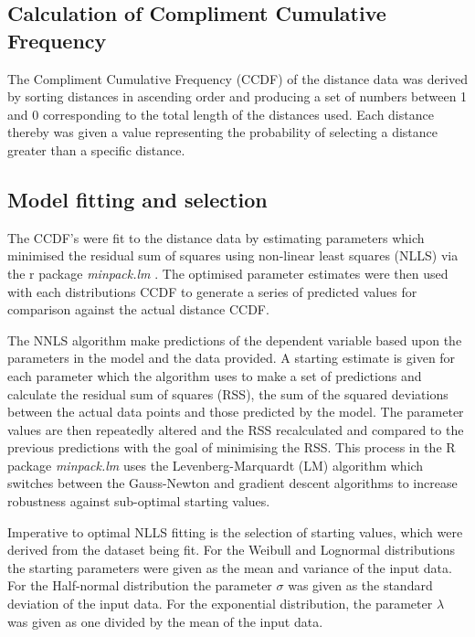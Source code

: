 \documentclass[11pt]{article}
\begin{document}
\begin{linenumbers}
\subsection{Calculation of Compliment Cumulative Frequency}
The Compliment Cumulative Frequency (CCDF) of the distance data was derived by sorting distances in ascending order and producing a set of numbers between 1 and 0 corresponding to the total length of the distances used. Each distance thereby was given a value representing the probability of selecting a distance greater than a specific distance.

\subsection{Model fitting and selection}
The CCDF's were fit to the distance data by estimating parameters which minimised the residual sum of squares using non-linear least squares (NLLS) via the r package \textit{minpack.lm} \citep{Timur2016}. The optimised parameter estimates were then used with each distributions CCDF to generate a series of predicted values for comparison against the actual distance CCDF.\par

The NNLS algorithm make predictions of the dependent variable based upon the parameters in the model and the data provided. A starting estimate is given for each parameter which the algorithm uses to make a set of predictions and calculate the residual sum of squares (RSS), the sum of the squared deviations between the actual data points and those predicted by the model. The parameter values are then repeatedly altered and the RSS recalculated and compared to the previous predictions with the goal of minimising the RSS. This process in the R package \textit{minpack.lm} uses the Levenberg-Marquardt (LM) algorithm which switches between the Gauss-Newton and gradient descent algorithms to increase robustness against sub-optimal starting values.\par

Imperative to optimal NLLS fitting is the selection of starting values, which were derived from the dataset being fit. For the Weibull and Lognormal distributions the starting parameters were given as the mean and variance of the input data. For the Half-normal distribution the parameter $\sigma$ was given as the standard deviation of the input data. For the exponential distribution, the parameter $\lambda$ was given as one divided by the mean of the input data.\par


\end{linenumbers}
\end{document}

